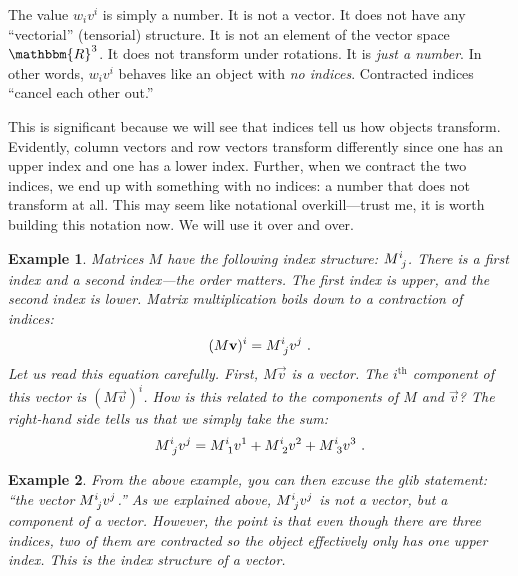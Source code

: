 \documentclass[12pt]{article}
\newtheorem{example}{Example}[section]
\begin{document}
The value $w_iv^i$ is simply a number. It is not a vector. It does not have any ``vectorial'' (tensorial) structure. It is not an element of the vector space $\mathbbm{R}^3$. It does not transform under rotations. It is \emph{just a number}. In other words, $w_iv^i$ behaves like an object with \emph{no indices}. Contracted indices ``cancel each other out.''

This is significant because we will see that indices tell us how objects transform. Evidently, column vectors and row vectors transform differently since one has an upper index and one has a lower index. Further, when we contract the two indices, we end up with something with no indices: a number that does not transform at all. This may seem like notational overkill---trust me, it is worth building this notation now. We will use it over and over.

\begin{example}
Matrices $M$ have the following index structure: $M\aij{i}{j}$. There is a first index and a second index---the order matters. The first index is upper, and the second index is lower. Matrix multiplication boils down to a contraction of indices:
\begin{align}
    (M\vec{v})^i = M\aij{i}{j}v^j \ .
    \label{eq:matrix:mult:ith:comp}
\end{align}
Let us read this equation carefully. First, $M\vec{v}$ is a vector. The $i^\text{th}$ component of this vector is $(M\vec{v})^i$. How is this related to the components of $M$ and $\vec{v}$? The right-hand side tells us that we simply take the sum:
\begin{align}
    M\aij{i}{j}v^j = 
    M\aij{i}{1}v^1 + M\aij{i}{2}v^2  + M\aij{i}{3}v^3 \ .
\end{align}
\end{example}
\begin{example}
From the above example, you can then excuse the glib statement: ``the \emph{vector} $M\aij{i}{j}v^j$.'' As we explained above, $M\aij{i}{j}v^j$ is not a vector, but a component of a vector. However, the point is that even though there are three indices, two of them are contracted so the object effectively only has one upper index. This is the index structure of a vector.
\end{example}
\end{document}
